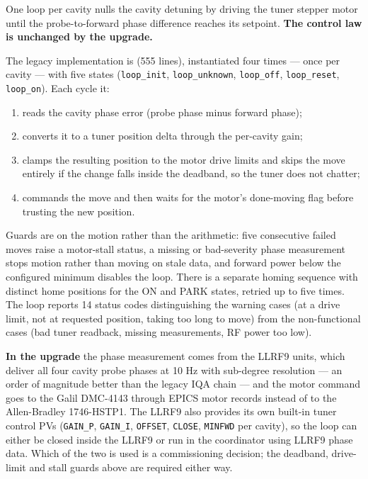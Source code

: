 One loop per cavity nulls the cavity detuning by driving the tuner stepper motor until the probe-to-forward phase difference reaches its setpoint. \textbf{The control law is unchanged by the upgrade.}

The legacy implementation is  (555 lines), instantiated four times --- once per cavity --- with five states (\texttt{loop\_init}, \texttt{loop\_unknown}, \texttt{loop\_off}, \texttt{loop\_reset}, \texttt{loop\_on}). Each cycle it:

\begin{enumerate}
\tightlist
\item
  reads the cavity phase error (probe phase minus forward phase);
\item
  converts it to a tuner position delta through the per-cavity gain;
\item
  clamps the resulting position to the motor drive limits and skips the move entirely if the change falls inside the deadband, so the tuner does not chatter;
\item
  commands the move and then waits for the motor's done-moving flag before trusting the new position.
\end{enumerate}

Guards are on the motion rather than the arithmetic: five consecutive failed moves raise a motor-stall status, a missing or bad-severity phase measurement stops motion rather than moving on stale data, and forward power below the configured minimum disables the loop. There is a separate homing sequence with distinct home positions for the ON and PARK states, retried up to five times. The loop reports 14 status codes distinguishing the warning cases (at a drive limit, not at requested position, taking too long to move) from the non-functional cases (bad tuner readback, missing measurements, RF power too low).

\textbf{In the upgrade} the phase measurement comes from the LLRF9 units, which deliver all four cavity probe phases at 10 Hz with sub-degree resolution --- an order of magnitude better than the legacy IQA chain --- and the motor command goes to the Galil DMC-4143 through EPICS motor records instead of to the Allen-Bradley 1746-HSTP1. The LLRF9 also provides its own built-in tuner control PVs (\texttt{GAIN\_P}, \texttt{GAIN\_I}, \texttt{OFFSET}, \texttt{CLOSE}, \texttt{MINFWD} per cavity), so the loop can either be closed inside the LLRF9 or run in the coordinator using LLRF9 phase data. Which of the two is used is a commissioning decision; the deadband, drive-limit and stall guards above are required either way.

